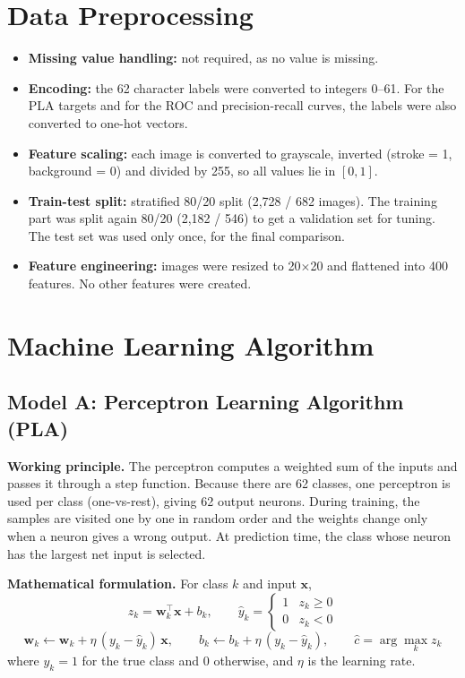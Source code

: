 \documentclass[12pt,a4paper]{article}
\begin{document}
\section{Data Preprocessing}
\begin{itemize}
\item \textbf{Missing value handling:} not required, as no value is missing.
\item \textbf{Encoding:} the 62 character labels were converted to integers 0--61. For the PLA targets and for the ROC and precision-recall curves, the labels were also converted to one-hot vectors.
\item \textbf{Feature scaling:} each image is converted to grayscale, inverted (stroke = 1, background = 0) and divided by 255, so all values lie in $[0,1]$.
\item \textbf{Train-test split:} stratified 80/20 split (2,728 / 682 images). The training part was split again 80/20 (2,182 / 546) to get a validation set for tuning. The test set was used only once, for the final comparison.
\item \textbf{Feature engineering:} images were resized to 20$\times$20 and flattened into 400 features. No other features were created.
\end{itemize}

\section{Machine Learning Algorithm}

\subsection{Model A: Perceptron Learning Algorithm (PLA)}
\textbf{Working principle.} The perceptron \cite{rosenblatt} computes a weighted sum of the inputs and passes it through a step function. Because there are 62 classes, one perceptron is used per class (one-vs-rest), giving 62 output neurons. During training, the samples are visited one by one in random order and the weights change only when a neuron gives a wrong output. At prediction time, the class whose neuron has the largest net input is selected.

\textbf{Mathematical formulation.} For class $k$ and input $\mathbf{x}$,
\begin{equation}
z_k = \mathbf{w}_k^{\top}\mathbf{x} + b_k, \qquad \hat{y}_k = \begin{cases} 1 & z_k \ge 0 \\ 0 & z_k < 0 \end{cases}
\end{equation}
\begin{equation}
\mathbf{w}_k \leftarrow \mathbf{w}_k + \eta\,(y_k-\hat{y}_k)\,\mathbf{x}, \qquad b_k \leftarrow b_k + \eta\,(y_k-\hat{y}_k), \qquad \hat{c} = \arg\max_k z_k
\end{equation}
where $y_k=1$ for the true class and 0 otherwise, and $\eta$ is the learning rate.
\end{document}
